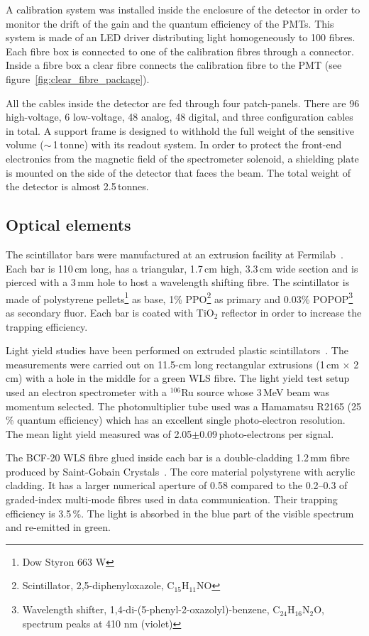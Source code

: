 \documentclass[a4paper,11pt]{article}
\begin{document}
A calibration system was installed inside the enclosure of the detector in order to monitor the drift of the gain and the quantum
efficiency of the PMTs. This system is made of an LED driver distributing light homogeneously to 100 fibres. Each fibre box is
connected to one of the calibration fibres through a connector. Inside a fibre box a clear fibre connects the calibration
fibre to the PMT (see figure~\ref{fig:clear_fibre_package}).

All the cables inside the detector are fed through four patch-panels. There are 96 high-voltage, 6 low-voltage, 48 analog, 48 digital,
and three configuration cables in total. A support frame is designed to withhold the full weight of the sensitive volume ($\sim$\,1\,tonne) with its readout system.
In order to protect the front-end electronics from the magnetic field of the spectrometer solenoid,  a shielding plate is mounted on the side of the detector that faces the beam. The total weight of the detector is almost
2.5\,tonnes.

\subsection{Optical elements}
The scintillator bars were manufactured at an extrusion facility at Fermilab~\cite{PlaDalmau:2001fr}. Each bar is 110\,cm long, has a triangular, 1.7\,cm high, 3.3\,cm wide section and is pierced with a 3\,mm hole to host a wavelength shifting fibre.
The scintillator is made of polystyrene pellets\footnote{Dow Styron 663 W} as base, 1\% PPO\footnote{Scintillator, 2,5-diphenyloxazole,
C$_{15}$H$_{11}$NO} as primary and 0.03\% POPOP\footnote{Wavelength shifter, 1,4-di-(5-phenyl-2-oxazolyl)-benzene, C$_{24}$H$_{16}$N$_{2}$O,
spectrum peaks at 410 nm (violet)} as secondary fluor. Each bar is coated with TiO$_2$ reflector in order to increase the trapping efficiency. 

Light yield studies have been performed on extruded plastic scintillators~\cite{PlaDalmau:2001fr}. 
The measurements were carried out on 11.5-cm long rectangular extrusions
(1\,cm $\times$ 2\,cm) with a hole in the middle for a green WLS fibre. The light yield test
setup used an electron spectrometer with a $^{106}$Ru source whose 3\,MeV beam was momentum selected. The photomultiplier tube used was a Hamamatsu R2165 (25\,\% quantum efficiency) which has an
excellent single photo-electron resolution. The mean light yield measured was of 2.05$\pm$0.09\,photo-electrons per signal.

The BCF-20 WLS fibre glued inside each bar is a double-cladding 1.2\,mm fibre produced by Saint-Gobain Crystals~\cite{saintgobain}.
The core material polystyrene with acrylic cladding. It has a larger numerical aperture of 0.58 compared to the 0.2--0.3
of graded-index multi-mode fibres used in data communication. Their trapping efficiency is 3.5\,\%. The light is absorbed in the blue part of
the visible spectrum and re-emitted in green. 
\end{document}
